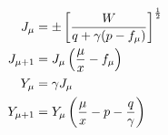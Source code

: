 \documentclass[12pt]{article}
\begin{document}
\begin{align}
J_\mu &= \pm\left[\frac{W}{q+\gamma(p-f_\mu)}\right]^\frac{1}{2} \notag \\
J_{\mu+1} &= J_\mu \left(\frac{\mu}{x}-f_\mu\right) \notag \\
Y_\mu &= \gamma J_\mu \notag \\
Y_{\mu+1} &= Y_\mu \left(\frac{\mu}{x}-p-\frac{q}{\gamma}\right) \notag
\end{align}
\end{document}
